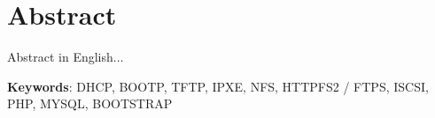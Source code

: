 \chapter*{Abstract}
Abstract in English...

\vfill
\textbf{Keywords}: DHCP, BOOTP, TFTP, IPXE, NFS, HTTPFS2 / FTPS, ISCSI, PHP, MYSQL, BOOTSTRAP